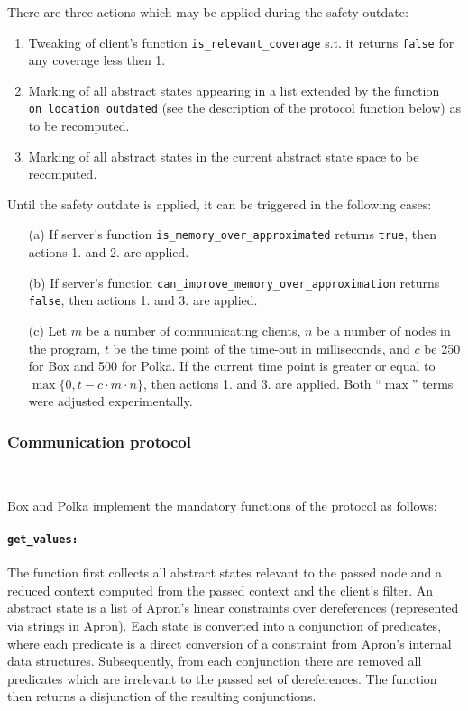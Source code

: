 \documentclass[envcountsame]{llncs}
\begin{document}
\noindent
There are three actions which may be applied during the safety outdate:
\begin{enumerate}
\item Tweaking of client's function \texttt{is\_relevant\_coverage} s.t. it
returns \texttt{false} for any coverage less then 1. \item Marking of all abstract states appearing in a list extended by the
function \texttt{on\_location\_outdated} (see the description of the protocol
function below) as to be recomputed. \item Marking of all abstract states in the current abstract state space to be
recomputed.
\end{enumerate}
Until the safety outdate is applied, it can be triggered in the following cases:
\begin{enumerate}
\item[(a)] If server's function \texttt{is\_memory\_over\_approximated} returns
\texttt{true}, then actions 1. and 2. are applied. \item[(b)] If server's function
\texttt{can\_improve\_memory\_over\_approximation} returns \texttt{false}, then
actions 1. and 3. are applied. \item[(c)] Let $ m $ be a number of communicating clients, $ n $ be a number of
nodes in the program, $ t $ be the time point of the time-out in milliseconds,
and $ c $ be 250 for Box and 500 for Polka. If the current time point is greater
or equal to $ \max\{0, t - c \cdot m \cdot n\} $, then actions 1. and 3. are
applied. Both ``$ \max $'' terms were adjusted experimentally.
\end{enumerate}


\subsubsection{Communication protocol}~\\
\label{sec:CommunicationBoxPolka}

Box and Polka implement the mandatory functions of the protocol as follows:

\paragraph{\tt get\_values: }

The function first collects all abstract states relevant to the passed node and
a reduced context computed from the passed context and the client's filter. An
abstract state is a list of Apron's linear constraints over dereferences
(represented via strings in Apron). Each state is converted into a conjunction
of predicates, where each predicate is a direct conversion of a constraint from
Apron's internal data structures. Subsequently, from each conjunction there are
removed all predicates which are irrelevant to the passed set of dereferences.
The function then returns a disjunction of the resulting conjunctions.
\end{document}

